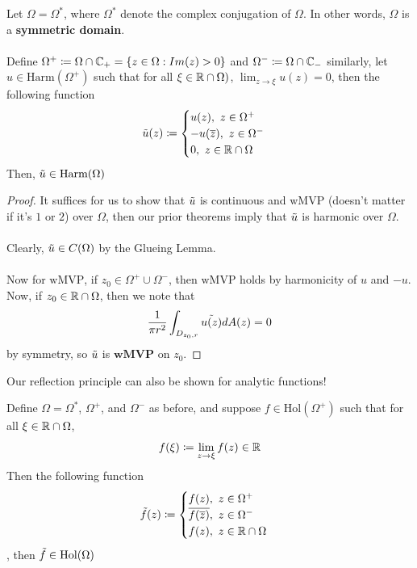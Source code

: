 \documentclass{article}
\begin{document}
\begin{corollary}
    Let $\Omega = \Omega^*$, where $\Omega^*$ denote the complex conjugation of $\Omega$. In other words, $\Omega$ is a \textbf{symmetric domain}.\\\\
    Define $\Omega^+ \coloneqq \Omega \cap \mathbb{C}_+ = \{z \in \Omega: Im(z) > 0\}$ and $\Omega^- \coloneqq \Omega \cap \mathbb{C}_-$ similarly, let $u \in \text{Harm}(\Omega^+)$ such that for all $\xi \in \mathbb{R} \cap \Omega)$, $\lim_{z \to \xi} u(z) = 0$, then the following function
    \[\Tilde{u}(z) \coloneqq \begin{cases}
    u(z),\ z \in \Omega^+\\
    -u(\overline{z}),\ z \in \Omega^-\\
    0,\ z \in \mathbb{R} \cap \Omega
    \end{cases}\]
    Then, $\Tilde{u} \in \text{Harm}(\Omega)$
\end{corollary}

\begin{proof}
It suffices for us to show that $\Tilde{u}$ is continuous and $\text{wMVP}$ (doesn't matter if it's $1$ or $2$) over $\Omega$, then our prior theorems imply that $\Tilde{u}$ is harmonic over $\Omega$.\\\\
Clearly, $\Tilde{u} \in C(\Omega)$ by the Glueing Lemma.\\\\
Now for $\text{wMVP}$, if $z_0 \in \Omega^+ \cup \Omega^-$, then $\text{wMVP}$ holds by harmonicity of $u$ and $-u$. Now, if $z_0 \in \mathbb{R} \cap \Omega$, then we note that
\[\frac{1}{\pi r^2} \int_{D_{z_0, r}} \Tilde{u(z)} dA(z) = 0\]
by symmetry, so $\Tilde{u}$ is $\textbf{wMVP}$ on $z_0$.
\end{proof}

Our reflection principle can also be shown for analytic functions!

\begin{theorem}
    Define $\Omega = \Omega^*$, $\Omega^+$, and $\Omega^-$ as before, and suppose $f \in \text{Hol}(\Omega^+)$ such that for all $\xi \in \mathbb{R} \cap \Omega$,
    \[f(\xi) \coloneqq \lim_{z \to \xi} f(z) \in \mathbb{R}\]
    Then the following function
    \[\Tilde{f}(z) \coloneqq \begin{cases}
    f(z),\ z \in \Omega^+\\
    \overline{f(\overline{z})},\ z \in \Omega^-\\
    f(z),\ z \in \mathbb{R} \cap \Omega
    \end{cases}\]
    , then $\Tilde{f} \in \text{Hol}(\Omega)$
\end{theorem}
\end{document}
